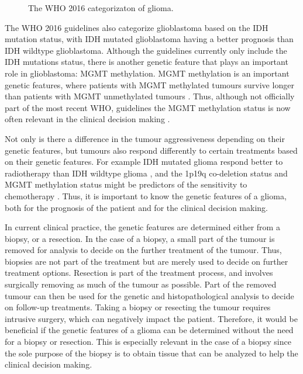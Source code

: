 \begin{figure}[hbt]
    \centering
    \caption{The WHO 2016 categorizaton of glioma.}\label{fig:intro_glioma_categorization}
\end{figure}

The \gls{WHO} 2016 guidelines also categorize glioblastoma based on the \gls{IDH} mutation status, with \gls{IDH} mutated glioblastoma having a better prognosis than \gls{IDH} wildtype glioblastoma.
Although the guidelines currently only include the \gls{IDH} mutations status, there is another genetic feature that plays an important role in glioblastoma: \gls{MGMT} methylation.
\gls{MGMT} methylation is an important genetic features, where patients with \gls{MGMT} methylated tumours survive longer than patients with \gls{MGMT} unmethylated tumours \autocite{martinez2007MGMT, gessler2018MGMT, weller2009molecularGBM}.
Thus, although not officially part of the most recent \gls{WHO}, guidelines the \gls{MGMT} methylation status is now often relevant in the clinical decision making \cite{molinaro2019geneticepidemiology}.

Not only is there a difference in the tumour aggressiveness depending on their genetic features, but tumours also respond differently to certain treatments based on their genetic features.
For example \gls{IDH} mutated glioma respond better to radiotherapy than \gls{IDH} wildtype glioma \autocite{juratli2015IDHtreatment}, and the 1p19q co-deletion status and MGMT methylation status might be predictors of the sensitivity to chemotherapy \autocite{idbaih2007markersresponse}.
Thus, it is important to know the genetic features of a glioma, both for the prognosis of the patient and for the clinical decision making.

In current clinical practice, the genetic features are determined either from a biopsy, or a resection.
In the case of a biopsy, a small part of the tumour is removed for analysis to decide on the further treatment of the tumour.
Thus, biopsies are not part of the treatment but are merely used to decide on further treatment options.
Resection is part of the treatment process, and involves surgically removing as much of the tumour as possible.
Part of the removed tumour can then be used for the genetic and histopathological analysis to decide on follow-up treatments.
Taking a biopsy or resecting the tumour requires intrusive surgery, which can negatively impact the patient.
Therefore, it would be beneficial if the genetic features of a glioma can be determined without the need for a biopsy or resection.
This is especially relevant in the case of a biopsy since the sole purpose of the biopsy is to obtain tissue that can be analyzed to help the clinical decision making.

